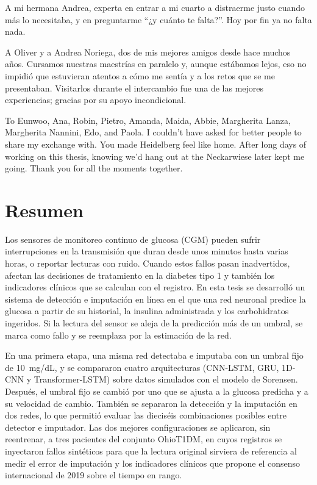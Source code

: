 \documentclass{report}
\begin{document}
A mi hermana Andrea, experta en entrar a mi cuarto a distraerme justo cuando más lo necesitaba, y en preguntarme ``¿y cuánto te falta?''. Hoy por fin ya no falta nada.

A Oliver y a Andrea Noriega, dos de mis mejores amigos desde hace muchos años. Cursamos nuestras maestrías en paralelo y, aunque estábamos lejos, eso no impidió que estuvieran atentos a cómo me sentía y a los retos que se me presentaban. Visitarlos durante el intercambio fue una de las mejores experiencias; gracias por su apoyo incondicional.

To Eunwoo, Ana, Robin, Pietro, Amanda, Maida, Abbie, Margherita Lanza, Margherita Nannini, Edo, and Paola. I couldn't have asked for better people to share my exchange with. You made Heidelberg feel like home. After long days of working on this thesis, knowing we'd hang out at the Neckarwiese later kept me going. Thank you for all the moments together.


\endgroup

\newpage

\chapter*{Resumen}

Los sensores de monitoreo continuo de glucosa (CGM) pueden sufrir interrupciones en la transmisión que duran desde unos minutos hasta varias horas, o reportar lecturas con ruido. Cuando estos fallos pasan inadvertidos, afectan las decisiones de tratamiento en la diabetes tipo 1 y también los indicadores clínicos que se calculan con el registro. En esta tesis se desarrolló un sistema de detección e imputación en línea en el que una red neuronal predice la glucosa a partir de su historial, la insulina administrada y los carbohidratos ingeridos. Si la lectura del sensor se aleja de la predicción más de un umbral, se marca como fallo y se reemplaza por la estimación de la red.

En una primera etapa, una misma red detectaba e imputaba con un umbral fijo de 10~mg/dL, y se compararon cuatro arquitecturas (CNN-LSTM, GRU, 1D-CNN y Transformer-LSTM) sobre datos simulados con el modelo de Sorensen. %
Después, el umbral fijo se cambió por uno que se ajusta a la glucosa predicha y a su velocidad de cambio. También se separaron la detección y la imputación en dos redes, lo que permitió evaluar las dieciséis combinaciones posibles entre detector e imputador. Las dos mejores configuraciones se aplicaron, sin reentrenar, a tres pacientes del conjunto OhioT1DM, en cuyos registros se inyectaron fallos sintéticos para que la lectura original sirviera de referencia al medir el error de imputación y los indicadores clínicos que propone el consenso internacional de 2019 sobre el tiempo en rango.
\end{document}
